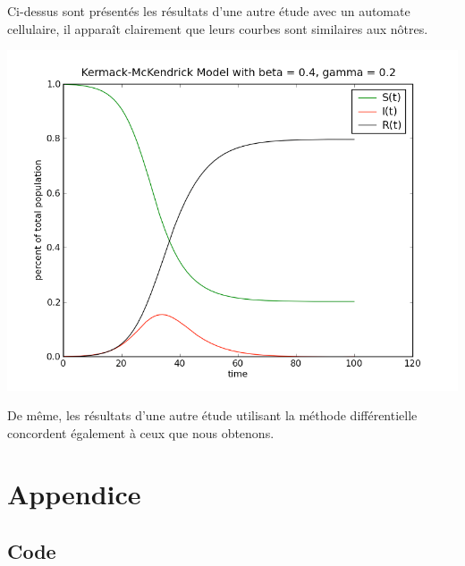\documentclass{article}
\begin{document}
Ci-dessus sont présentés les résultats d'une autre étude avec un automate cellulaire, il apparaît clairement que leurs courbes sont similaires aux nôtres.

\includegraphics[scale=0.5]{../images/differentiel_1.png} 

De même, les résultats d'une autre étude utilisant la méthode différentielle concordent également à ceux que nous obtenons.

\section{Appendice}
	\subsection{Code}

\lstset{breaklines=true}


\end{document}
